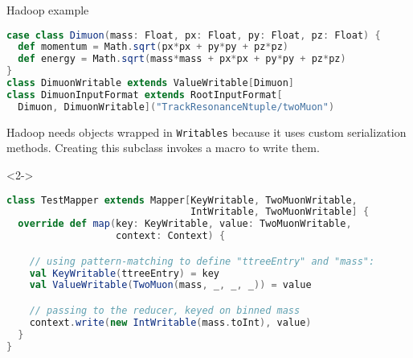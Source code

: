 \documentclass{beamer}
\begin{document}
\begin{frame}[fragile]{Hadoop example}
\begin{minipage}{1.1\linewidth}
\begin{lstlisting}[language=scala]
case class Dimuon(mass: Float, px: Float, py: Float, pz: Float) {
  def momentum = Math.sqrt(px*px + py*py + pz*pz)
  def energy = Math.sqrt(mass*mass + px*px + py*py + pz*pz)
}
class DimuonWritable extends ValueWritable[Dimuon]
class DimuonInputFormat extends RootInputFormat[
  Dimuon, DimuonWritable]("TrackResonanceNtuple/twoMuon")
\end{lstlisting}
\end{minipage}

Hadoop needs objects wrapped in {\tt Writables} because it uses custom serialization methods. Creating this subclass invokes a macro to write them.

\begin{uncoverenv}<2->
\begin{lstlisting}[language=scala]
class TestMapper extends Mapper[KeyWritable, TwoMuonWritable,
                                IntWritable, TwoMuonWritable] {
  override def map(key: KeyWritable, value: TwoMuonWritable,
                   context: Context) {

    // using pattern-matching to define "ttreeEntry" and "mass":
    val KeyWritable(ttreeEntry) = key
    val ValueWritable(TwoMuon(mass, _, _, _)) = value

    // passing to the reducer, keyed on binned mass
    context.write(new IntWritable(mass.toInt), value)
  }
}
\end{lstlisting}
\end{uncoverenv}
\end{frame}
\end{document}
